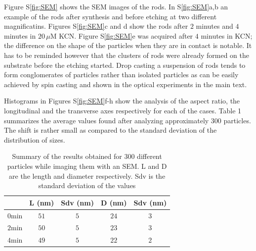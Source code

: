 \documentclass[journal=jpccck]{achemso}
\newcommand{\uM}{\ensuremath{\,\mu\textrm{M}}}
\begin{document}
Figure S\ref{fig:SEM} shows the SEM images of the rods. In S\ref{fig:SEM}a,b an
example of the rods after synthesis and before etching at two different
magnificatins. Figures S\ref{fig:SEM}c and d show the rods after $2$ minutes and
$4$ minutes in $20\uM$ KCN. Figure S\ref{fig:SEM}e was acquired after $4$
minutes in KCN; the difference on the shape of the particles when they are in
contact is notable. It has to be reminded however that the clusters of rods were
already formed on the substrate before the etching started. Drop casting a
suspension of rods tends to form conglomerates of particles rather than isolated
particles as can be easily achieved by spin casting and shown in the optical
experiments in the main text.

Histograms in Figures S\ref{fig:SEM}f-h show the
analysis of the aspect ratio, the longitudinal and the transverse axes
respectively for each of the cases. Table 1 summarizes the average values found
after analyzing approximately $300$ particles. The shift is rather small as
compared to the standard deviation of the distribution of sizes. 

\begin{table}[htp]
\begin{tabular*}{0.48\textwidth}{c c c c c}
 $\,$ & L (nm) & Sdv (nm) & D (nm) & Sdv (nm) \\\hline
 $0\textrm{min}$ & $51$ & $5$ & $24$ & $3$ \\
 $2\textrm{min}$ & $50$ & $5$ & $23$ & $3$ \\
 $4\textrm{min}$ & $49$ & $5$ & $22$ & $2$ \\
\end{tabular*}
\label{tab:SEM_results}
\caption{Summary of the results obtained for 300 different particles while
imaging them with an SEM. L and D are the length and diameter respectively.
Sdv is the standard deviation of the values}
\end{table}
\end{document}
